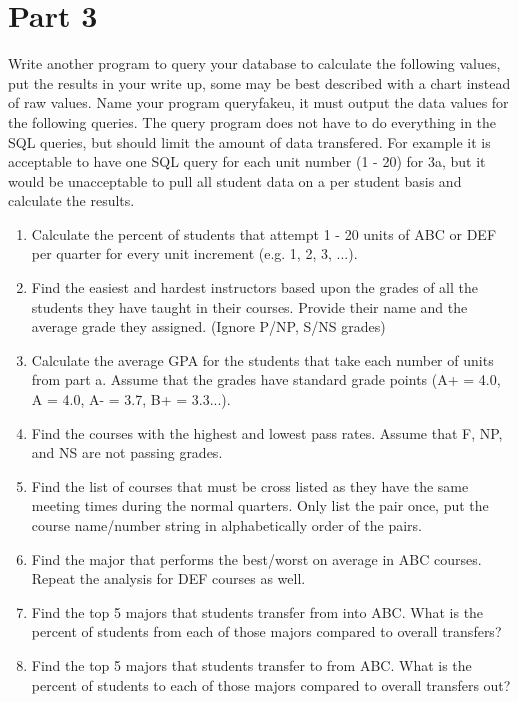 \documentclass{article}
\begin{document}
\section*{Part 3}
Write another program to query your database to calculate the following values, put the results in your write up, some may be best described with a chart instead of raw values. 
Name your program queryfakeu, it must output the data values for the following queries. 
The query program does not have to do everything in the SQL queries, but should limit the amount of data transfered. 
For example it is acceptable to have one SQL query for each unit number (1 - 20) for 3a, but it would be unacceptable to pull all student data on a per student basis and calculate the results. 
\begin{enumerate}[label=\alph*.]
\item Calculate the percent of students that attempt 1 - 20 units of ABC or DEF per quarter for every unit increment (e.g. 1, 2, 3, ...). \\
 \clearpage
\item Find the easiest and hardest instructors based upon the grades of all the students they have taught in their courses. Provide their name and the average grade they assigned. (Ignore P/NP, S/NS grades) \\
 \clearpage
\item Calculate the average GPA for the students that take each number of units from part a. Assume that the grades have standard grade points (A+ = 4.0, A = 4.0, A- = 3.7, B+ = 3.3...). \\
 \clearpage
\item Find the courses with the highest and lowest pass rates. Assume that F, NP, and NS are not passing grades. \\
 \clearpage
\item Find the list of courses that must be cross listed as they have the same meeting times during the normal quarters. Only list the pair once, put the course name/number string in alphabetically order of the pairs. \\
 \clearpage
\item Find the major that performs the best/worst on average in ABC courses. Repeat the analysis for DEF courses as well. \\
 \clearpage
\item Find the top 5 majors that students transfer from into ABC. What is the percent of students from each of those majors compared to overall transfers? \\
 \clearpage
\item Find the top 5 majors that students transfer to from ABC. What is the percent of students to each of those majors compared to overall transfers out? \\
 \clearpage
\end{enumerate}
\end{document}
